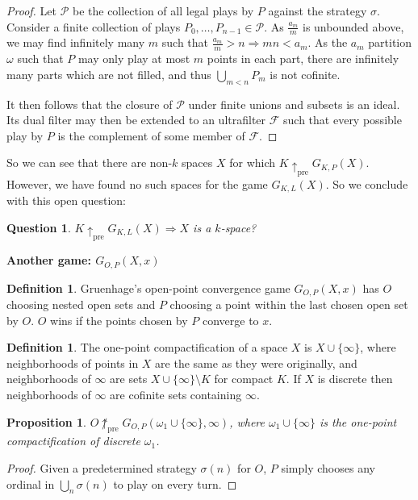 \documentclass[11pt]{article}
\theoremstyle{plain}
\newtheorem{proposition}[theorem]{Proposition}
\newtheorem{question}[theorem]{Question}
\theoremstyle{definition}
\newtheorem{definition}[theorem]{Definition}
\theoremstyle{remark}
\newcommand{\prewin}{\uparrow_{\text{pre}}}
\begin{document}
\begin{proof}
Let $\mathcal{P}$ be the collection of all legal plays by $P$ against the strategy $\sigma$. Consider a finite collection of plays $P_0,\dots,P_{n-1}\in \mathcal{P}$. As $\frac{a_m}{m}$ is unbounded above, we may find infinitely many $m$ such that $\frac{a_m}{m}>n \Rightarrow mn<a_m$. As the $a_m$ partition $\omega$ such that $P$ may only play at most $m$ points in each part, there are infinitely many parts which are not filled, and thus $\bigcup_{m<n} P_m$ is not cofinite.

It then follows that the closure of $\mathcal{P}$ under finite unions and subsets is an ideal. Its dual filter may then be extended to an ultrafilter $\mathcal{F}$ such that every possible play by $P$ is the complement of some member of $\mathcal{F}$.
\end{proof}

So we can see that there are non-$k$ spaces $X$ for which $K\prewin G_{K,P}(X)$. However, we have found no such spaces for the game $G_{K,L}(X)$. So we conclude with this open question:

\begin{question}
$K \prewin G_{K,L}(X) \Rightarrow X$ is a $k$-space?
\end{question}

\centerline{\bf Another game: $G_{O,P}(X,x)$}

\begin{definition} 
Gruenhage's open-point convergence game $G_{O,P}(X,x)$ has $O$ choosing nested open sets and $P$ choosing a point within the last chosen open set by $O$. $O$ wins if the points chosen by $P$ converge to $x$.
\end{definition}

\begin{definition}
The one-point compactification of a space $X$ is $X\cup\{\infty\}$, where neighborhoods of points in $X$ are the same as they were originally, and neighborhoods of $\infty$ are sets $X\cup\{\infty\}\setminus K$ for compact $K$. If $X$ is discrete then neighborhoods of $\infty$ are cofinite sets containing $\infty$. 
\end{definition}

\begin{proposition}
$O\not\prewin G_{O,P}(\omega_1\cup\{\infty\},\infty)$, where $\omega_1\cup\{\infty\}$ is the one-point compactification of discrete $\omega_1$.
\end{proposition}

\begin{proof}
Given a predetermined strategy $\sigma(n)$ for $O$, $P$ simply chooses any ordinal in $\bigcup_n \sigma(n)$ to play on every turn.
\end{proof}
\end{document}
